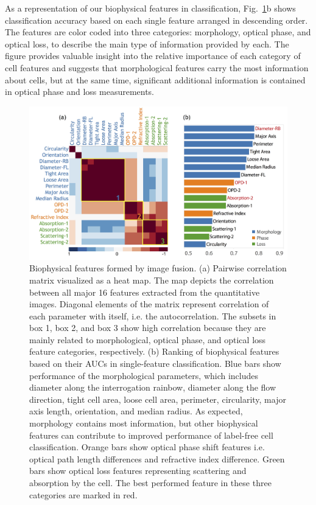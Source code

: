 \documentclass[aps,pra,reprint,superscriptaddress]{revtex4-1}
\begin{document}
As a representation of our biophysical features in classification, Fig.~\ref{fig:FeaturesCorrRank}b shows classification accuracy based on each single feature arranged in descending order. The features are color coded into three categories: morphology, optical phase, and optical loss, to describe the main type of information provided by each. The figure provides valuable insight into the relative importance of each category of cell features and suggests that morphological features carry the most information about cells, but at the same time, significant additional information is contained in optical phase and loss measurements. 

\begin{figure}
\includegraphics[scale=0.17]{FigureFeaturesCorrelationRank.jpg}
\caption{\label{fig:FeaturesCorrRank} Biophysical features formed by image fusion. (a) Pairwise correlation matrix visualized as a heat map. The map depicts the correlation between all major 16 features extracted from the quantitative images. Diagonal elements of the matrix represent correlation of each parameter with itself, i.e. the autocorrelation. The subsets in box 1, box 2, and box 3 show high correlation because they are mainly related to morphological, optical phase, and optical loss feature categories, respectively. (b) Ranking of biophysical features based on their AUCs in single-feature classification. Blue bars show performance of the morphological parameters, which includes diameter along the interrogation rainbow, diameter along the flow direction, tight cell area, loose cell area, perimeter, circularity, major axis length, orientation, and median radius. As expected, morphology contains most information, but other biophysical features can contribute to improved performance of label-free cell classification. Orange bars show optical phase shift features i.e. optical path length differences and refractive index difference. Green bars show optical loss features representing scattering and absorption by the cell. The best performed feature in these three categories are marked in red.}
\end{figure}
\end{document}
